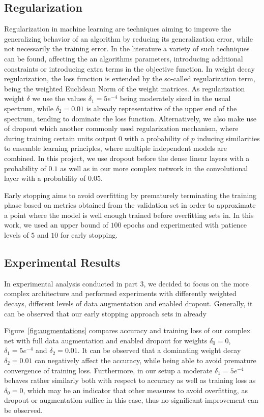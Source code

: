 \documentclass[12pt]{article}
\begin{document}
\subsection{Regularization}
Regularization in machine learning are techniques aiming to improve the generalizing behavior of an algorithm by reducing its generalization error, while not necessarily the training error. In the literature a variety of such techniques can be found, affecting the an algorithms parameters, introducing additional constraints or introducing extra terms in the objective function. In weight decay regularization, the loss function is extended by the so-called regularization term, being the weighted Euclidean Norm of the weight matrices. As regularization weight $\delta$ we use the values $\delta_1=5e^{-4}$ being moderately sized in the usual spectrum, while $\delta_2=0.01$ is already representative of the upper end of the spectrum, tending to dominate the loss function. Alternatively, we also make use of dropout which another commonly used regularization mechanism, where during training certain units output $0$ with a probability of $p$ inducing similarities to ensemble learning principles, where multiple independent models are combined. In this project, we use dropout before the dense linear layers with a probability of $0.1$ as well as in our more complex network in the convolutional layer with a probability of $0.05$. 

Early stopping aims to avoid overfitting by prematurely terminating the training phase based on metrics obtained from the validation set in order to approximate a point where the model is well enough trained before overfitting sets in. In this work, we used an upper bound of $100$ epochs and experimented with patience levels of $5$ and $10$ for early stopping. 

\subsection{Experimental Results}
In experimental analysis conducted in part 3, we decided to focus on the more complex architecture and performed experiments with differently weighted decays, different levels of data augmentation and enabled dropout. 
Generally, it can be observed that our early stopping approach sets in already 


Figure~\ref{fig:augmentations} compares accuracy and training loss of our complex net with full data augmentation and enabled dropout for weights $\delta_0=0$, $\delta_1=5e^{-4}$ and $\delta_2=0.01$. It can be observed that a dominating weight decay $\delta_2=0.01$ can negatively affect the accuracy, while being able to avoid premature convergence of training loss. Furthermore, in our setup a moderate $\delta_1=5e^{-4}$ behaves rather similarly both with respect to accuracy as well as training loss as $\delta_0=0$, which may be an indicator that other measures to avoid overfitting, as dropout or augmentation suffice in this case, thus no significant improvement can be observed. 
\end{document}
